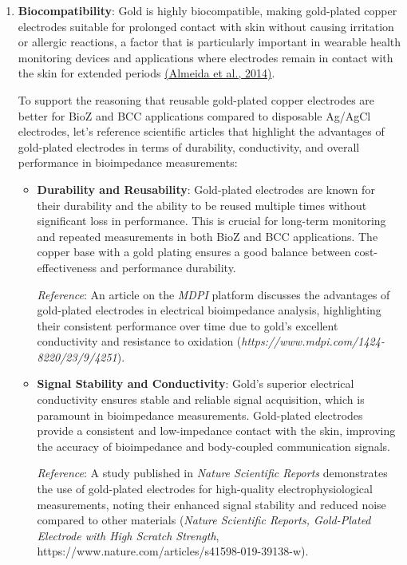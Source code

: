 {\begin{enumerate}
    \item \textbf{Biocompatibility}: Gold is highly biocompatible, making gold-plated copper electrodes suitable for prolonged contact with skin without causing irritation or allergic reactions, a factor that is particularly important in wearable health monitoring devices and applications where electrodes remain in contact with the skin for extended periods \href{https://consensus.app/papers/onsite-fuel-electroanalysis-determination-lead-copper-almeida/91bc0dde8e93533dba0e38522669a3ec/?utm_source=chatgpt}{(Almeida et al., 2014)}.

    To support the reasoning that reusable gold-plated copper electrodes are better for BioZ and BCC applications compared to disposable Ag/AgCl electrodes, let's reference scientific articles that highlight the advantages of gold-plated electrodes in terms of durability, conductivity, and overall performance in bioimpedance measurements:

\begin{itemize}
    \item \textbf{Durability and Reusability}: Gold-plated electrodes are known for their durability and the ability to be reused multiple times without significant loss in performance. This is crucial for long-term monitoring and repeated measurements in both BioZ and BCC applications. The copper base with a gold plating ensures a good balance between cost-effectiveness and performance durability. 
    
    \textit{Reference}: An article on the \textit{MDPI} platform discusses the advantages of gold-plated electrodes in electrical bioimpedance analysis, highlighting their consistent performance over time due to gold's excellent conductivity and resistance to oxidation (\textit{https://www.mdpi.com/1424-8220/23/9/4251}).
    
    \item \textbf{Signal Stability and Conductivity}: Gold's superior electrical conductivity ensures stable and reliable signal acquisition, which is paramount in bioimpedance measurements. Gold-plated electrodes provide a consistent and low-impedance contact with the skin, improving the accuracy of bioimpedance and body-coupled communication signals.
    
    \textit{Reference}: A study published in \textit{Nature Scientific Reports} demonstrates the use of gold-plated electrodes for high-quality electrophysiological measurements, noting their enhanced signal stability and reduced noise compared to other materials (\textit{Nature Scientific Reports, Gold-Plated Electrode with High Scratch Strength}, https://www.nature.com/articles/s41598-019-39138-w).
    

\end{itemize}
\end{enumerate}}
